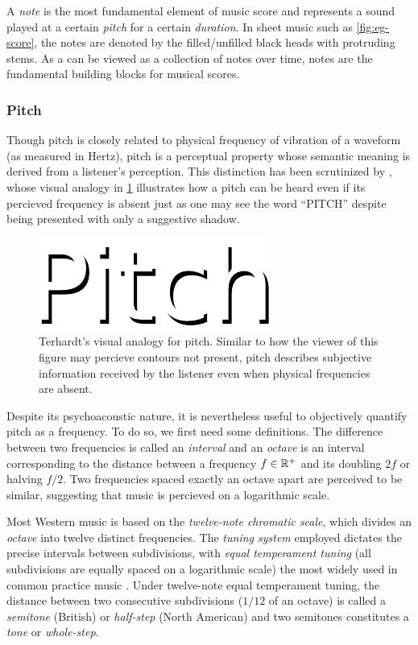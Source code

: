 A \emph{note} is the most fundamental element of music score and
represents a sound played at a certain \emph{pitch} for a certain
\emph{duration}. In sheet music such as \cref{fig:eg-score}, the notes are
denoted by the filled/unfilled black heads with protruding stems. As a can be
viewed as a collection of notes over time, notes are the fundamental building
blocks for musical scores.

\subsubsection{Pitch}

Though pitch is closely related to physical frequency of vibration of a
waveform (as measured in Hertz), pitch is a perceptual property whose semantic
meaning is derived from a listener's perception. This distinction has been
scrutinized by \citet{:/content/asa/journal/jasa/55/5/10.1121/1.1914648}, whose
visual analogy in \cref{fig:pitch} illustrates how a pitch can be heard even if
its percieved frequency is absent just as one may see the word ``PITCH''
despite being presented with only a suggestive shadow.

\begin{figure}[tb]
    \centering
    \includegraphics[width=0.6\linewidth]{pitch.pdf}
    \caption{Terhardt's visual analogy for pitch. Similar to how the viewer of this figure may percieve contours not present, pitch describes subjective information received by the listener even when physical frequencies are absent.}
    \label{fig:pitch}
\end{figure}

Despite its psychoacoustic nature, it is nevertheless useful to objectively
quantify pitch as a frequency. To do so, we first need some definitions. The
difference between two frequencies is called an \emph{interval} and an
\emph{octave} is an interval corresponding to the distance between a frequency
$f \in \mathbb{R}^+$ and its doubling $2f$ or halving $f/2$. Two frequencies spaced
exactly an octave apart are perceived to be similar, suggesting that music is
percieved on a logarithmic scale.

Most Western music is based on the \emph{twelve-note chromatic scale}, which
divides an \emph{octave} into twelve distinct frequencies. The \emph{tuning
system} employed dictates the precise intervals between subdivisions, with
\emph{equal temperament tuning} (all subdivisions are equally spaced on a
logarithmic scale) the most widely used in common practice music
\citep{denton1997history}. Under twelve-note equal temperament tuning, the
distance between two consecutive subdivisions ($1/12$ of an octave) is called a
\emph{semitone} (British) or \emph{half-step} (North American) and two
semitones constitutes a \emph{tone} or \emph{whole-step}.

